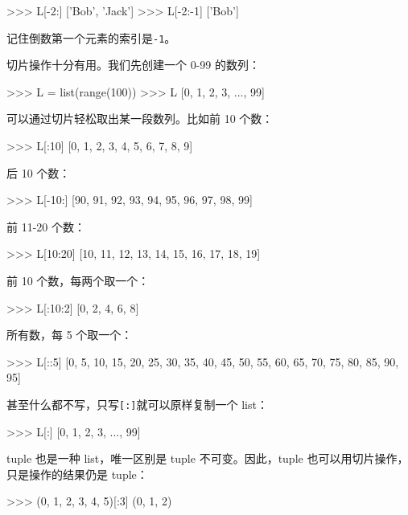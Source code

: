 \begin{pythoncode}
>>> L[-2:]
['Bob', 'Jack']
>>> L[-2:-1]
['Bob']
\end{pythoncode}

记住倒数第一个元素的索引是\texttt{-1}。

切片操作十分有用。我们先创建一个 0-99 的数列：

\begin{pythoncode}
>>> L = list(range(100))
>>> L
[0, 1, 2, 3, ..., 99]
\end{pythoncode}

可以通过切片轻松取出某一段数列。比如前 10 个数：

\begin{pythoncode}
>>> L[:10]
[0, 1, 2, 3, 4, 5, 6, 7, 8, 9]
\end{pythoncode}

后 10 个数：

\begin{pythoncode}
>>> L[-10:]
[90, 91, 92, 93, 94, 95, 96, 97, 98, 99]
\end{pythoncode}

前 11-20 个数：

\begin{pythoncode}
>>> L[10:20]
[10, 11, 12, 13, 14, 15, 16, 17, 18, 19]
\end{pythoncode}

前 10 个数，每两个取一个：

\begin{pythoncode}
>>> L[:10:2]
[0, 2, 4, 6, 8]
\end{pythoncode}

所有数，每 5 个取一个：

\begin{pythoncode}
>>> L[::5]
[0, 5, 10, 15, 20, 25, 30, 35, 40, 45, 50, 55, 60, 65, 70, 75, 80, 85, 90, 95]
\end{pythoncode}

甚至什么都不写，只写\texttt{{[}:{]}}就可以原样复制一个 list：

\begin{pythoncode}
>>> L[:]
[0, 1, 2, 3, ..., 99]
\end{pythoncode}

tuple 也是一种 list，唯一区别是 tuple 不可变。因此，tuple
也可以用切片操作，只是操作的结果仍是 tuple：

\begin{pythoncode}
>>> (0, 1, 2, 3, 4, 5)[:3]
(0, 1, 2)
\end{pythoncode}

